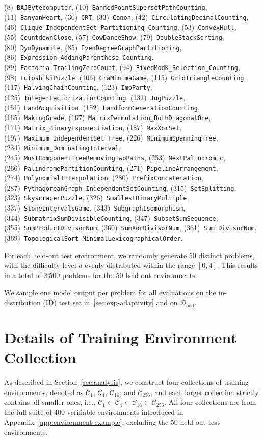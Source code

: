 \documentclass{article}
\theoremstyle{plain}
\theoremstyle{definition}
\theoremstyle{remark}
\begin{document}
\begin{flushleft}
(8)~\texttt{BAJBytecomputer},
(10)~\texttt{BannedPointSupersetPathCounting},
(11)~\texttt{BanyanHeart},
(30)~\texttt{CRT},
(33)~\texttt{Canon},
(42)~\texttt{CirculatingDecimalCounting},
(46)~\texttt{Clique\_IndependentSet\_Partitioning\_Counting},
(53)~\texttt{ConvexHull},
(55)~\texttt{CountdownClose},
(57)~\texttt{CowDanceShow},
(79)~\texttt{DoubleStackSorting},
(80)~\texttt{DynDynamite},
(85)~\texttt{EvenDegreeGraphPartitioning},
(86)~\texttt{Expression\_AddingParenthese\_Counting},
(89)~\texttt{FactorialTrailingZeroCount},
(94)~\texttt{FixedModK\_Selection\_Counting},
(98)~\texttt{FutoshikiPuzzle},
(106)~\texttt{GraMinimaGame},
(115)~\texttt{GridTriangleCounting},
(117)~\texttt{HalvingChainCounting},
(123)~\texttt{ImpParty},
(125)~\texttt{IntegerFactorizationCounting},
(131)~\texttt{JugPuzzle},
(151)~\texttt{LandAcquisition},
(152)~\texttt{LandformGenerationCounting},
(165)~\texttt{MakingGrade},
(167)~\texttt{MatrixPermutation\_BothDiagonalOne},
(171)~\texttt{Matrix\_BinaryExponentiation},
(187)~\texttt{MaxXorSet},
(197)~\texttt{Maximum\_IndependentSet\_Tree},
(226)~\texttt{MinimumSpanningTree},
(234)~\texttt{Minimum\_DominatingInterval},
(245)~\texttt{MostComponentTreeRemovingTwoPaths},
(253)~\texttt{NextPalindromic},
(266)~\texttt{PalindromePartitionCounting},
(271)~\texttt{PipelineArrangement},
(274)~\texttt{PolynomialInterpolation},
(280)~\texttt{PrefixConcatenation},
(287)~\texttt{PythagoreanGraph\_IndependentSetCounting},
(315)~\texttt{SetSplitting},
(323)~\texttt{SkyscraperPuzzle},
(326)~\texttt{SmallestBinaryMultiple},
(337)~\texttt{StoneIntervalsGame},
(343)~\texttt{SubgraphIsomorphism},
(344)~\texttt{SubmatrixSumDivisibleCounting},
(347)~\texttt{SubsetSumSequence},
(355)~\texttt{SumProductDivisorNum},
(360)~\texttt{SumXorDivisorNum},
(361)~\texttt{Sum\_DivisorNum},
(369)~\texttt{TopologicalSort\_MinimalLexicographicalOrder}.
\end{flushleft}

For each held-out test environment, we randomly generate 50 distinct problems, 
with the difficulty level $d$ evenly distributed within the range $[0, 4]$.
This results in a total of 2,500 problems for the 50 held-out environments.

We sample one model output per problem for all evaluations on the in-distribution (ID) test set in~\ref{sec:exp-adaptivity} and on $\mathcal{D}_{\text{ood}}$.





\section{Details of Training Environment Collection}
\label{app:analysis}
As described in Section~\ref{sec:analysis}, we construct four collections of training environments, denoted as $\mathcal{C}_1$, $\mathcal{C}_4$, $\mathcal{C}_{16}$, and $\mathcal{C}_{256}$, and each larger collection strictly contains all smaller ones, i.e., $\mathcal{C}_1 \subset \mathcal{C}_4 \subset \mathcal{C}_{16} \subset \mathcal{C}_{256}$.
All four collections are from the full suite of 400 verifiable environments introduced in Appendix~\ref{app:environment-example}, excluding the 50 held-out test environments.
\end{document}

